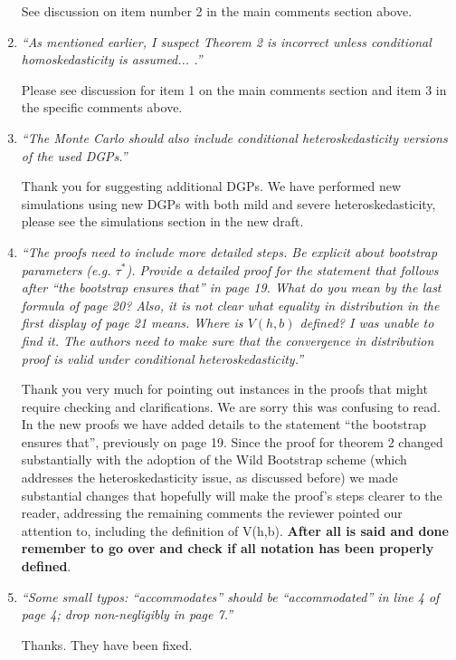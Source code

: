 \documentclass[12pt,fleqn]{article}
\begin{document}
\begin{enumerate}
See discussion on item number 2 in the main comments section above.

\item \textit{``As mentioned earlier, I suspect Theorem 2 is incorrect unless conditional homoskedasticity is assumed... .''}

  Please see discussion for item 1 on the main comments section and item 3 in the specific comments above.

\item \textit{``The Monte Carlo should also include conditional heteroskedasticity versions of the used DGPs.''}

  Thank you for suggesting additional DGPs. We have performed new simulations using new DGPs with both mild and severe heteroskedasticity, please see the simulations section in the new draft.

\item \textit{``The proofs need to include more detailed steps. Be explicit about bootstrap parameters (e.g. $\tau^{*}$). Provide a detailed proof for the statement that follows after ``the bootstrap ensures that'' in page 19. What do you mean by the last formula of page 20? Also, it is not clear what equality in distribution in the first display of page 21 means. Where is $V(h,b)$ defined? I was unable to find it. The authors need to make sure that the convergence in distribution proof is valid under conditional heteroskedasticity.''}

Thank you very much for pointing out instances in the proofs that might require checking and clarifications. We are sorry this was confusing to read. In the new proofs we have added details to the statement ``the bootstrap ensures that'', previously on page 19. Since the proof for theorem 2 changed substantially with the adoption of the Wild Bootstrap scheme (which addresses the heteroskedasticity issue, as discussed before) we made substantial changes that hopefully will make the proof's steps clearer to the reader, addressing the remaining comments the reviewer pointed our attention to, including the definition of V(h,b). \textbf{After all is said and done remember to go over and check if all notation has been properly defined}.

\item \textit{``Some small typos: ``accommodates'' should be ``accommodated'' in line 4 of page 4; drop non-negligibly in page 7.''}
 
Thanks. They have been fixed.

\end{enumerate}
\end{document}
